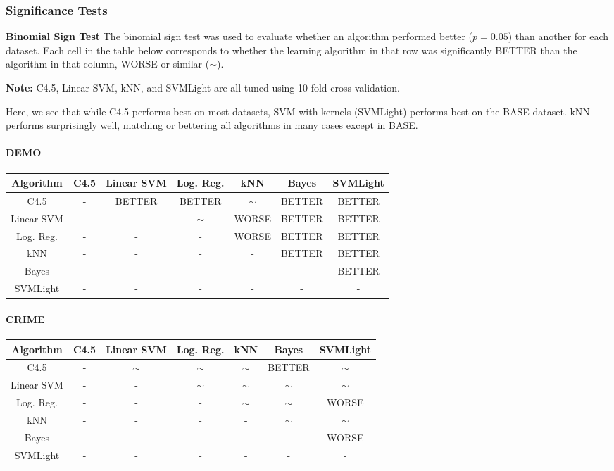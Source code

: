\documentclass[11pt,letter]{article}
\begin{document}
\subsubsection{Significance Tests}

\textbf{Binomial Sign Test}
The binomial sign test was used to evaluate whether an algorithm performed better ($p=0.05$) than another for each dataset. Each cell in the table below corresponds to whether the learning algorithm in that row was significantly BETTER than the algorithm in that column, WORSE or similar ($\sim$).

\textbf{Note:} C4.5, Linear SVM, kNN, and SVMLight are all tuned using 10-fold cross-validation.

Here, we see that while C4.5 performs best on most datasets, SVM with kernels (SVMLight) performs best on the BASE dataset. kNN performs surprisingly well, matching or bettering all algorithms in many cases except in BASE.

\paragraph{DEMO} \quad

\begin{tabular}{|c|c|c|c|c|c|c|}
\hline
Algorithm & C4.5  & Linear SVM & Log. Reg.  & kNN  & Bayes & SVMLight \\
\hline
C4.5 	& -		& BETTER	& BETTER	& $\sim$	& BETTER	& BETTER	\\
Linear SVM		& -		& -			& $\sim$	& WORSE		& BETTER	& BETTER	\\
Log. Reg. 	& -		& -			& -			& WORSE		& BETTER	& BETTER	\\
kNN 		& -		& -			& -			& -			& BETTER	& BETTER	\\
Bayes			& -		& -			& -			& -			& -			& BETTER	\\
SVMLight & - & - & - & - & - & - \\
\hline
\end{tabular}

\paragraph{CRIME} \quad

\begin{tabular}{|c|c|c|c|c|c|c|}
\hline
Algorithm & C4.5  & Linear SVM & Log. Reg. & kNN  & Bayes & SVMLight \\
\hline
C4.5 	& -		& $\sim$	& $\sim$	& $\sim$	& BETTER	& $\sim$	\\
Linear SVM		& -		& -			& $\sim$	& $\sim$	& $\sim$	& $\sim$	\\
Log. Reg. 	& -		& -			& -			& $\sim$	& $\sim$	& WORSE 	\\
kNN 		& -		& -			& -			& -			& $\sim$	& $\sim$	\\
Bayes			& -		& -			& -			& -			& -			& WORSE		\\
SVMLight & - & - & - & - & - & - \\
\hline
\end{tabular}
\end{document}
